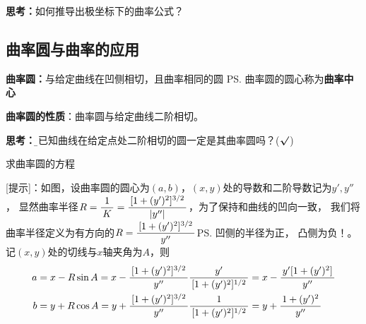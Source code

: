 {\bf 思考：}如何推导出极坐标下的曲率公式？

\subsection{曲率圆与曲率的应用}

{\bf 曲率圆：}与给定曲线在凹侧相切，且曲率相同的圆
\ps{曲率圆的圆心称为{\bf 曲率中心}}

\begin{thx}
	{\bf 曲率圆的性质}：曲率圆与给定曲线二阶相切。
\end{thx}

{\bf 思考：}{\b 与已知曲线在给定点处二阶相切的圆一定是其曲率圆吗？(${\bm{\surd}}$)}

\egz 求曲率圆的方程

\begin{center}
\end{center}

[提示]：如图，设曲率圆的圆心为$(a,b)$，$(x,y)$处的导数和二阶导数记为$y',y''$，
显然曲率半径$R=\displaystyle\frac{\,{1}\,}{\,{K}\,}=\displaystyle\frac{\,{[1+(y')^2]^{3/2}}\,}{\,{|y''|}\,}$，为了保持和曲线的凹向一致，
我们将曲率半径定义为有方向的$R=\displaystyle\frac{\,{[1+(y')^2]^{3/2}}\,}{\,{y''}\,}$\ps{凹侧的半径为正，
凸侧为负！}。记$(x,y)$处的切线与$x$轴夹角为$A$，则
\begin{align}
	a&=x-R\sin A=x-\displaystyle\frac{\,{[1+(y')^2]^{3/2}}\,}{\,{y''}\,}\displaystyle\frac{\,{y'}\,}{\,{[1+(y')^2]^{1/2}}\,}
	=x-\displaystyle\frac{\,{y'[1+(y')^2]}\,}{\,{y''}\,}\notag\\
	b&=y+R\cos A=y+\displaystyle\frac{\,{[1+(y')^2]^{3/2}}\,}{\,{y''}\,}\displaystyle\frac{\,{1}\,}{\,{[1+(y')^2]^{1/2}}\,}
	=y+\displaystyle\frac{\,{1+(y')^2}\,}{\,{y''}\,}\notag
\end{align}

